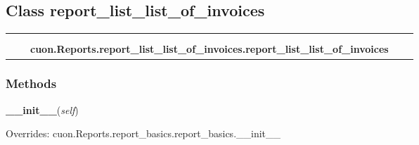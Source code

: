 \subsection{Class report\_list\_list\_of\_invoices}

    \label{cuon:Reports:report_list_list_of_invoices:report_list_list_of_invoices}
\begin{tabular}{cccccc}
\multicolumn{2}{r}{\settowidth{\BCL}{cuon.Reports.report\_basics.report\_basics}\multirow{2}{\BCL}{cuon.Reports.report\_basics.report\_basics}}
&&
  \\\cline{3-3}
  &&\multicolumn{1}{c|}{}
&&
  \\
&&\multicolumn{2}{l}{\textbf{cuon.Reports.report\_list\_list\_of\_invoices.report\_list\_list\_of\_invoices}}
\end{tabular}



  \subsubsection{Methods}

    \vspace{0.5ex}

\hspace{.8\funcindent}\begin{boxedminipage}{\funcwidth}

    \raggedright \textbf{\_\_init\_\_}(\textit{self})

\setlength{\parskip}{2ex}
\setlength{\parskip}{1ex}
      Overrides: cuon.Reports.report\_basics.report\_basics.\_\_init\_\_

    \end{boxedminipage}

    \label{cuon:Reports:report_list_list_of_invoices:report_list_list_of_invoices:getReportData}

    \vspace{0.5ex}

